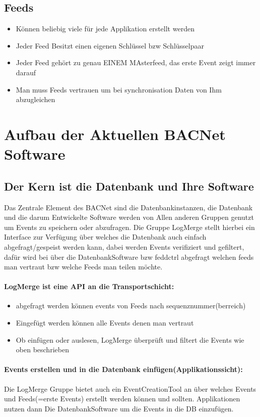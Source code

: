 \documentclass[a4paper, fontsize=9pt, oneside, headsepline=.5pt,footsepline=.5pt]{scrartcl}
\begin{document}
\subsection{Feeds}
\begin{itemize}
    \item Können beliebig viele für jede Applikation erstellt werden
    \item Jeder Feed Besitzt einen eigenen Schlüssel bzw Schlüsselpaar
    \item Jeder Feed gehört zu genau EINEM MAsterfeed, das erste Event zeigt immer darauf
    \item Man muss Feeds vertrauen um bei synchronisation Daten von Ihm abzugleichen 
\end{itemize}

\section{Aufbau der Aktuellen BACNet Software}

\subsection{Der Kern ist die Datenbank und Ihre Software}
Das Zentrale Element des BACNet sind die Datenbankinstanzen, die Datenbank und die darum Entwickelte Software werden von Allen anderen Gruppen genutzt um
Events zu speichern oder abzufragen. Die Gruppe LogMerge stellt hierbei ein Interface zur Verfügung über welches die Datenbank auch einfach abgefragt/gespeist werden kann, dabei werden Events verifiziert und gefiltert, dafür wird bei über die DatenbankSoftware bzw feddctrl abgefragt welchen feeds man vertraut bzw welche Feeds man teilen möchte.

\paragraph{LogMerge ist eine API an die Transportschicht:}
\begin{itemize}
    \item abgefragt werden können events von Feeds nach sequenznummer(berreich)
    \item Eingefügt werden können alle Events denen man vertraut
    \item Ob einfügen oder auslesen, LogMerge überprüft und filtert die Events wie oben beschrieben
\end{itemize}

\paragraph{Events erstellen und in die Datenbank einfügen(Applikationssicht):}
Die LogMerge Gruppe bietet auch ein EventCreationTool an über welches Events und Feeds(=erste Events) erstellt werden können und sollten. Applikationen nutzen dann Die DatenbankSoftware um die Events in die DB einzufügen.
\end{document}
